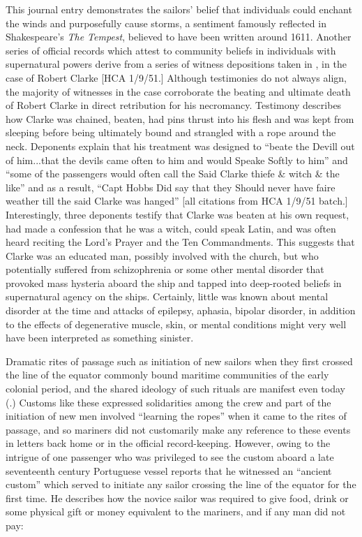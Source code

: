 This journal entry demonstrates the sailors’ belief that individuals could enchant the winds and purposefully cause storms, a sentiment famously reflected in Shakespeare’s \textit{The Tempest}, believed to have been written around 1611. Another series of official records which attest to community beliefs in individuals with supernatural powers derive from a series of witness depositions taken in \citealt{Virginia1661}, in the case of Robert Clarke [HCA 1/9/51.] Although testimonies do not always align, the majority of witnesses in the case corroborate the beating and ultimate death of Robert Clarke in direct retribution for his necromancy. Testimony describes how Clarke was chained, beaten, had pins thrust into his flesh and was kept from sleeping before being ultimately bound and strangled with a rope around the neck. Deponents explain that his treatment was designed to “beate the Devill out of him...that the devils came often to him and would Speake Softly to him” and “some of the passengers would often call the Said Clarke thiefe \& witch \& the like” and as a result, “Capt Hobbs Did say that they Should never have faire weather till the said Clarke was hanged” [all citations from HCA 1/9/51 batch.] Interestingly, three deponents testify that Clarke was beaten at his own request, had made a confession that he was a witch, could speak Latin, and was often heard reciting the Lord’s Prayer and the Ten Commandments. This suggests that Clarke was an educated man, possibly involved with the church, but who potentially suffered from schizophrenia or some other mental disorder that provoked mass hysteria aboard the ship and tapped into deep-rooted beliefs in supernatural agency on the ships. Certainly, little was known about mental disorder at the time and attacks of epilepsy, aphasia, bipolar disorder, in addition to the effects of degenerative muscle, skin, or mental conditions might very well have been interpreted as something sinister. 

  Dramatic rites of passage such as initiation of new sailors when they first crossed the line of the equator commonly bound maritime communities of the early colonial period, and the shared ideology of such rituals are manifest even today (\citealt{Bronner2006}.) Customs like these expressed solidarities among the crew and part of the initiation of new men involved “learning the ropes” when it came to the rites of passage, and so mariners did not customarily make any reference to these events in letters back home or in the official record-keeping. However, owing to the intrigue of one passenger who was privileged to see the custom aboard a late seventeenth century Portuguese vessel reports that he witnessed an “ancient custom” which served to initiate any sailor crossing the line of the equator for the first time. He describes how the novice sailor was required to give food, drink or some physical gift or money equivalent to the mariners, and if any man did not pay: 

